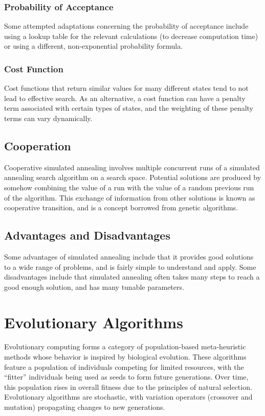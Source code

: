 \documentclass[12pt,titlepage]{article}
\let\stdsection\section
\renewcommand\section{\clearpage\stdsection}
\begin{document}
      \subsubsection{Probability of Acceptance}
        Some attempted adaptations concerning the probability of acceptance include using a lookup table for the relevant calculations (to decrease computation time) or using a different,
        non-exponential probability formula.

      \subsubsection{Cost Function}
        Cost functions that return similar values for many different states tend to not lead to effective search. As an alternative, a cost function can have a penalty term associated with
        certain types of states, and the weighting of these penalty terms can vary dynamically.

    \subsection{Cooperation}
      Cooperative simulated annealing involves multiple concurrent runs of a simulated annealing search algorithm on a search space. Potential solutions are produced by somehow combining
      the value of a run with the value of a random previous run of the algorithm. This exchange of information from other solutions is known as cooperative transition, and is a concept
      borrowed from genetic algorithms.

    \subsection{Advantages and Disadvantages}
      Some advantages of simulated annealing include that it provides good solutions to a wide range of problems, and is fairly simple to understand and apply.
      Some disadvantages include that simulated annealing often takes many steps to reach a good enough solution, and has many tunable parameters.

  \section{Evolutionary Algorithms}
    Evolutionary computing forms a category of population-based meta-heuristic methods whose behavior is inspired by biological evolution. These algorithms feature a population of
    individuals competing for limited resources, with the ``fitter'' individuals being used as seeds to form future generations. Over time, this population rises in overall fitness
    due to the principles of natural selection. Evolutionary algorithms are stochastic, with variation operators (crossover and mutation) propagating changes to new generations.
\end{document}
